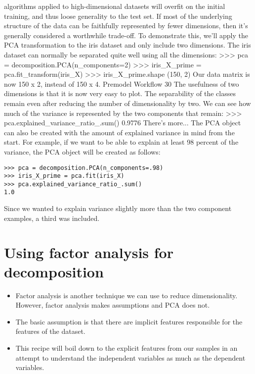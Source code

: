\documentclass[SKL-MASTER.tex]{subfiles}
\begin{document}
algorithms applied to high-dimensional datasets will overfit on the initial training, and thus
loose generality to the test set. If most of the underlying structure of the data can be faithfully
represented by fewer dimensions, then it's generally considered a worthwhile trade-off.
To demonstrate this, we'll apply the PCA transformation to the iris dataset and only
include two dimensions. The iris dataset can normally be separated quite well using
all the dimensions:
>>> pca = decomposition.PCA(n_components=2)
>>> iris_X_prime = pca.fit_transform(iris_X)
>>> iris_X_prime.shape
(150, 2)
Our data matrix is now 150 x 2, instead of 150 x 4.
Premodel Workflow
30
The usefulness of two dimensions is that it is now very easy to plot.
The separability of the classes remain even after reducing the number of dimensionality by two.
We can see how much of the variance is represented by the two components that remain:
>>> pca.explained_variance_ratio_.sum()
0.9776
There's more...
The PCA object can also be created with the amount of explained variance in mind from
the start. For example, if we want to be able to explain at least 98 percent of the variance,
the PCA object will be created as follows:
\begin{framed}
\begin{verbatim}
>>> pca = decomposition.PCA(n_components=.98)
>>> iris_X_prime = pca.fit(iris_X)
>>> pca.explained_variance_ratio_.sum()
1.0
\end{verbatim}
\end{framed}
Since we wanted to explain variance slightly more than the two component examples, a third
was included.
\newpage
\section{Using factor analysis for decomposition}
\begin{itemize}
\item Factor analysis is another technique we can use to reduce dimensionality. However, factor
analysis makes assumptions and PCA does not. 
\item The basic assumption is that there are
implicit features responsible for the features of the dataset.
\item This recipe will boil down to the explicit features from our samples in an attempt to
understand the independent variables as much as the dependent variables.
\end{itemize}
\end{document}
